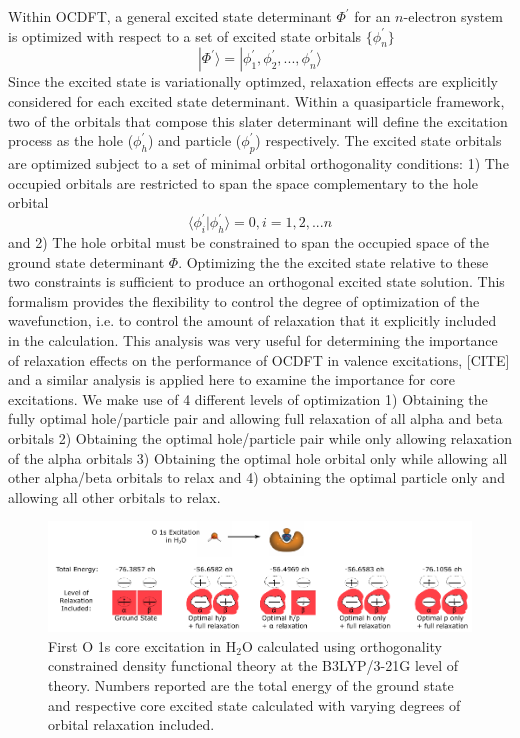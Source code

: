 \documentclass[final]{emory}
\begin{document}
Within OCDFT, a general excited state determinant $\Phi^{\prime}$ for an $n$-electron system is optimized with respect to a set of excited state orbitals $\{\phi_n^{\prime}\}$ 
\begin{equation}
|\Phi^{\prime} \rangle = | \phi^{\prime}_1, \phi^{\prime}_2, ..., \phi^{\prime}_n \rangle
\end{equation}
Since the excited state is variationally optimzed, relaxation effects are explicitly considered for each excited state determinant. Within a quasiparticle framework, two of the orbitals that compose this slater determinant will define the excitation process as the hole ($\phi^{\prime}_h$) and particle ($\phi^{\prime}_p$) respectively. The excited state orbitals are optimized subject to a set of minimal orbital orthogonality conditions: 1) The occupied orbitals are restricted to span the space complementary to the hole orbital 
\begin{equation}
\langle \phi^{\prime}_i|\phi_h^{\prime}\rangle = 0, i=1,2,...n
\end{equation}
and 2) The hole orbital must be constrained to span the occupied space of the ground state determinant $\Phi$. Optimizing the the excited state relative to these two constraints is sufficient to produce an orthogonal excited state solution. This formalism provides the flexibility to control the degree of optimization of the wavefunction, i.e. to control the amount of relaxation that it explicitly included in the calculation. This analysis was very useful for determining the importance of relaxation effects on the performance of OCDFT in valence excitations, [CITE] and a similar analysis is applied here to examine the importance for core excitations. We make use of 4 different levels of optimization 1) Obtaining the fully optimal hole/particle pair and allowing full relaxation of all alpha and beta orbitals 2) Obtaining the optimal hole/particle pair while only allowing relaxation of the alpha orbitals 3) Obtaining the optimal hole orbital only while allowing all other alpha/beta orbitals to relax and 4) obtaining the optimal particle only and allowing all other orbitals to relax. 
\begin{figure}
\centering
\includegraphics{h_p_algorithms.pdf}
\caption{First O 1s core excitation in H$_2$O calculated using orthogonality constrained density functional theory at the B3LYP/3-21G level of theory. Numbers reported are the total energy of the ground state and respective core excited state calculated with varying degrees of orbital relaxation included.}
\label{fig:relax}
\end{figure}
\end{document}

